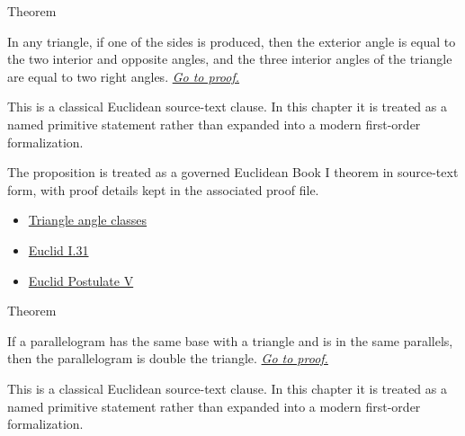 \begin{theorembox}{Theorem}
\begin{theorem}
\label{thm:euclid-i-32}
In any triangle, if one of the sides is produced, then the exterior angle is
equal to the two interior and opposite angles, and the three interior angles of
the triangle are equal to two right angles.
\hyperref[prf:euclid-i-32]{\textit{Go to proof.}}
\end{theorem}
\end{theorembox}

\begin{remark*}
This is a classical Euclidean source-text clause. In this chapter it is treated
as a named primitive statement rather than expanded into a modern first-order
formalization.
\end{remark*}

\begin{remark*}[Interpretation]
The proposition is treated as a governed Euclidean Book I theorem in source-text
form, with proof details kept in the associated proof file.
\end{remark*}
\begin{lra-not-visible}
\begin{dependencies}
\begin{itemize}
  \item \hyperref[def:euclid-triangle-angle-classes]{Triangle angle classes}
  \item \hyperref[thm:euclid-i-31]{Euclid I.31}
  \item \hyperref[ax:euclid-postulate-parallel]{Euclid Postulate V}
\end{itemize}
\end{dependencies}
\end{lra-not-visible}

\begin{theorembox}{Theorem}
\begin{theorem}
\label{thm:euclid-i-41}
If a parallelogram has the same base with a triangle and is in the same
parallels, then the parallelogram is double the triangle.
\hyperref[prf:euclid-i-41]{\textit{Go to proof.}}
\end{theorem}
\end{theorembox}

\begin{remark*}
This is a classical Euclidean source-text clause. In this chapter it is treated
as a named primitive statement rather than expanded into a modern first-order
formalization.
\end{remark*}

